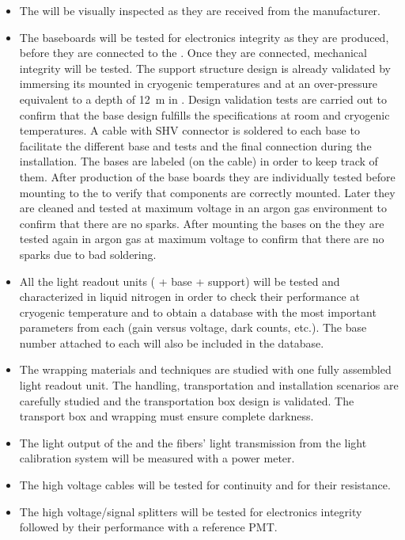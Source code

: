 \begin{itemize}
\item The  will be visually inspected as they are received from the manufacturer.

\item The baseboards will be tested for electronics integrity as they are produced, before they are connected to the . Once they are connected, mechanical integrity will be tested. The  support structure design is already validated by immersing its mounted  in cryogenic temperatures and at an over-pressure equivalent to a depth of \SI{12}{m} in \lar{}. Design validation tests are carried out to confirm that the  base design fulfills the specifications at room and cryogenic temperatures. A cable with SHV connector is soldered to each  base to facilitate the different base and  tests and the final  connection during the installation. The  bases are labeled (on the cable) in order to keep track of them. After production of the  base boards they are individually tested before mounting to the  to verify that components are correctly mounted. Later they are cleaned and tested at maximum voltage in an argon gas environment to confirm that there are no sparks. After mounting the bases on the  they are tested again in argon gas at maximum voltage to confirm that there are no sparks due to bad soldering.

\item All the light readout units ( + base + support) will be tested and characterized in liquid nitrogen in order to check their performance at cryogenic temperature and to obtain a database with the most important parameters from each  (gain versus voltage, dark counts, etc.). The  base number attached to each  will also be included in the database.

\item The wrapping materials and techniques are studied with one fully assembled light readout unit. The handling, transportation and installation scenarios are carefully studied and the transportation box design is validated. The transport box and  wrapping must  ensure complete darkness.

\item The light output of the  and the fibers' light transmission from the light calibration system will be measured with a power meter.

\item The high voltage cables will be tested for continuity and for their resistance.

\item The high voltage/signal splitters will be tested for electronics integrity followed by their performance with a reference PMT.

\end{itemize}

